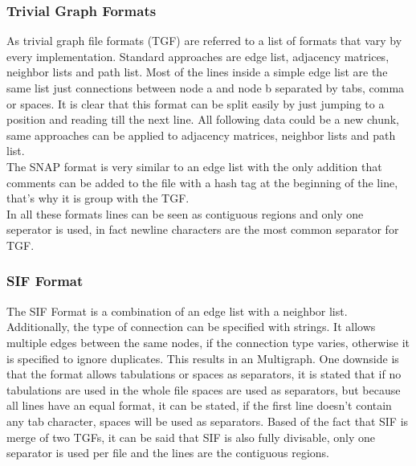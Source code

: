 \subsubsection{Trivial Graph Formats}
As trivial graph file formats (TGF) are referred to a list of formats that vary by every implementation. Standard approaches are edge list, adjacency matrices, neighbor lists and path list.
Most of the lines inside a simple edge list are the same list just connections between node a and node b separated by tabs, comma or spaces. It is clear that this format can be split easily by just jumping to a position and reading till the next line. All following data could be a new chunk, same approaches can be applied to adjacency matrices, neighbor lists and path list.\\
The SNAP format is very similar to an edge list with the only addition that comments can be added to the file with a hash tag at the beginning of the line, that’s why it is group with the TGF.\\
In all these formats lines can be seen as contiguous regions and only one seperator is used, in fact newline characters are the most common separator for TGF. \cite{Roughan.10.03.2015}

\subsubsection{SIF Format}
The SIF Format is a combination of an edge list with a neighbor list. Additionally, the type of connection can be specified with strings. It allows multiple edges between the same nodes, if the connection type varies, otherwise it is specified to ignore duplicates. This results in an Multigraph. One downside is that the format allows tabulations or spaces as separators, it is stated that if no tabulations are used in the whole file spaces are used as separators, but because all lines have an equal format, it can be stated, if the first line doesn’t contain any tab character, spaces will be used as separators. Based of the fact that SIF is merge of two TGFs, it can be said that SIF is also fully divisable, only one separator is used per file and the lines are the contiguous regions. \cite{TheCytoscapeConsortium.2017}

